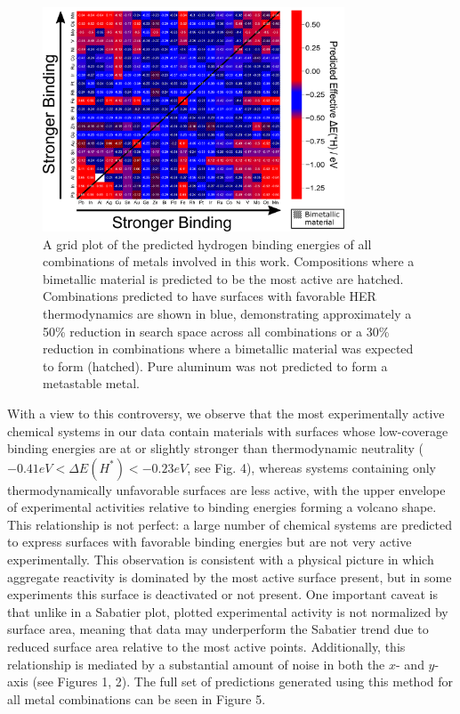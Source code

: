 \documentclass[preprint,12pt]{elsarticle}
\begin{document}
\begin{figure}[h]
\centering
    \includegraphics[width=0.8\textwidth]{figures/fig_5.pdf}
\caption{A grid plot of the predicted hydrogen binding energies of all combinations of metals involved in this work. Compositions where a bimetallic material is predicted to be the most active are hatched. Combinations predicted to have surfaces with favorable HER thermodynamics are shown in blue, demonstrating approximately a 50\% reduction in search space across all combinations or a 30\% reduction in combinations where a bimetallic material was expected to form (hatched). Pure aluminum was not predicted to form a metastable metal.
}
\end{figure}

With a view to this controversy, we observe that the most experimentally active chemical systems in our data contain materials with surfaces whose low-coverage binding energies are at or slightly stronger than thermodynamic neutrality ($-0.41 eV < \Delta E(H^*) < -0.23 eV$, see Fig. 4), whereas systems containing only thermodynamically unfavorable surfaces are less active, with the upper envelope of experimental activities relative to binding energies forming a volcano shape. This relationship is not perfect: a large number of chemical systems are predicted to express surfaces with favorable binding energies but are not very active experimentally. This observation is consistent with a physical picture in which aggregate reactivity is dominated by the most active surface present, but in some experiments this surface is deactivated or not present. One important caveat is that unlike in a Sabatier plot, plotted experimental activity is not normalized by surface area, meaning that data may underperform the Sabatier trend due to reduced surface area relative to the most active points. Additionally, this relationship is mediated by a substantial amount of noise in both the $x$- and $y$-axis (see Figures 1, 2). The full set of predictions generated using this method for all metal combinations can be seen in Figure 5.
\end{document}
